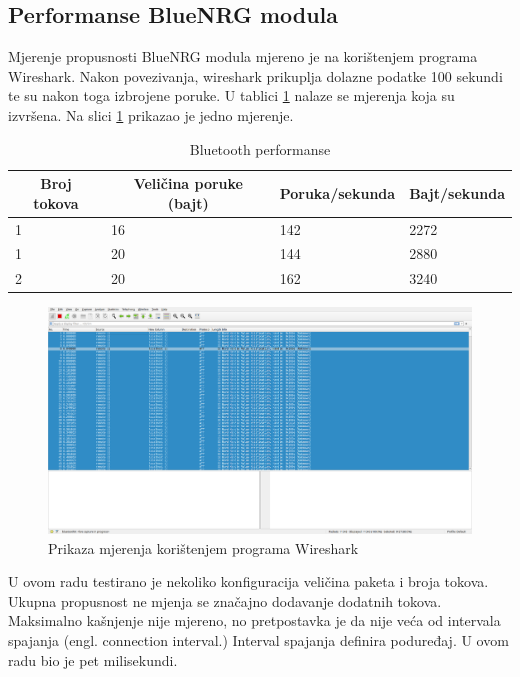 \documentclass[times, utf8, diplomski]{diplomski}
\begin{document}
\subsection{Performanse BlueNRG modula}

Mjerenje propusnosti BlueNRG modula mjereno je na korištenjem programa Wireshark\cite{wireshark}. Nakon povezivanja, wireshark prikuplja dolazne podatke 100 sekundi te su nakon toga izbrojene poruke. U tablici \ref{perftable} nalaze se mjerenja koja su izvršena. Na slici \ref{fig:wireshark} prikazao je jedno mjerenje.

\begin{table}[H]
  \begin{center}
    \begin{tabular}[c]{l|l|l|l}
      \hline
      \multicolumn{1}{c|}{\textbf{Broj tokova}} &
      \multicolumn{1}{c}{\textbf{Veličina poruke (bajt)}} &
      \multicolumn{1}{c}{\textbf{Poruka/sekunda}} &
      \multicolumn{1}{c}{\textbf{Bajt/sekunda}} \\
      \hline
      1 & 16 & 142 & 2272 \\
      1 & 20 & 144 & 2880 \\
      2 & 20 & 162 & 3240 \\
      \hline
    \end{tabular}
  \caption{Bluetooth performanse}
  \label{perftable}
  \end{center}
\end{table}

\begin{figure}[H]
\includegraphics[width=\textwidth]{wireshark_100sec_20230622_225645.png}
\centering
\caption{Prikaza mjerenja korištenjem programa Wireshark\cite{wireshark}}
\label{fig:wireshark}
\end{figure}

U ovom radu testirano je nekoliko konfiguracija veličina paketa i broja tokova. Ukupna propusnost ne mjenja se značajno dodavanje dodatnih tokova. Maksimalno kašnjenje nije mjereno, no pretpostavka je da nije veća od intervala spajanja (engl. connection interval.) Interval spajanja definira poduređaj. U ovom radu bio je pet milisekundi.
\end{document}
